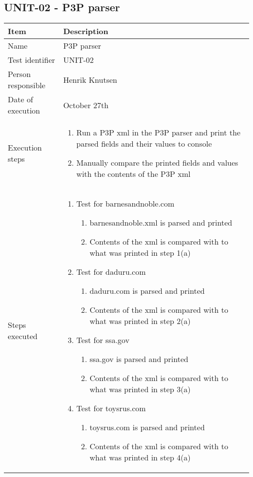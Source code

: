 \documentclass[a4paper]{article}
\begin{document}
\subsection{UNIT-02 - P3P parser}
	\begin{center}
		\begin{tabular}{ |  p{3cm} | p{7cm} | }
			\hline
			Item & Description \\ [5pt] \hline \hline
			Name & P3P parser \\  [5pt] \hline
			Test identifier & UNIT-02 \\  [5pt] \hline
			Person responsible & Henrik Knutsen \\  [5pt] \hline
			Date of execution & October 27th \\  [5pt] \hline

			Execution steps & 	\begin{enumerate}
							\item Run a P3P xml in the P3P parser and print the parsed fields and their values to console
							\item Manually compare the printed fields and values with the contents of the P3P xml
						\end{enumerate} \\ [5pt] \hline

			Steps executed & 	\begin{enumerate}
							\item Test for barnesandnoble.com
							\begin{enumerate}
								\item barnesandnoble.xml is parsed and printed
								\item Contents of the xml is compared with to what was printed in step 1(a)
							\end{enumerate}
							\item Test for daduru.com
							\begin{enumerate}
								\item daduru.com is parsed and printed
								\item Contents of the xml is compared with to what was printed in step 2(a)
							\end{enumerate}
							\item Test for ssa.gov
							\begin{enumerate}
								\item ssa.gov is parsed and printed
								\item Contents of the xml is compared with to what was printed in step 3(a)
							\end{enumerate}
							\item Test for toysrus.com
							\begin{enumerate}
								\item toysrus.com is parsed and printed
								\item Contents of the xml is compared with to what was printed in step 4(a)
							\end{enumerate}
						\end{enumerate} \\ [5pt] \hline
			

\end{tabular}
\end{center}
\end{document}
